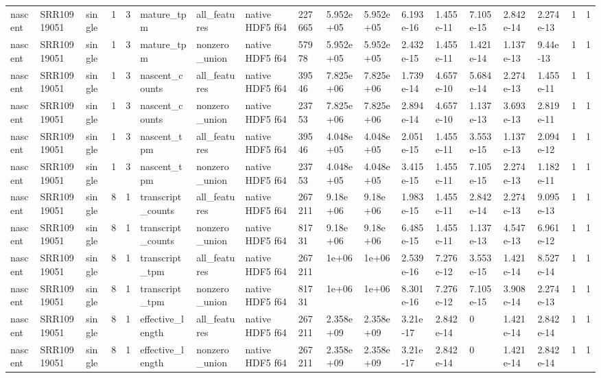 \begin{tabular}{llllllllllllllllll}
nascent & SRR10919051 & single & 1 & 3 & mature\_tpm & all\_features & native HDF5 f64 & 227665 & 5.952e+05 & 5.952e+05 & 6.193e-16 & 1.455e-11 & 7.105e-15 & 2.842e-14 & 2.274e-13 & 1 & 1 \\
nascent & SRR10919051 & single & 1 & 3 & mature\_tpm & nonzero\_union & native HDF5 f64 & 57978 & 5.952e+05 & 5.952e+05 & 2.432e-15 & 1.455e-11 & 1.421e-14 & 1.137e-13 & 9.44e-13 & 1 & 1 \\
nascent & SRR10919051 & single & 1 & 3 & nascent\_counts & all\_features & native HDF5 f64 & 39546 & 7.825e+06 & 7.825e+06 & 1.739e-14 & 4.657e-10 & 5.684e-14 & 2.274e-13 & 1.455e-11 & 1 & 1 \\
nascent & SRR10919051 & single & 1 & 3 & nascent\_counts & nonzero\_union & native HDF5 f64 & 23753 & 7.825e+06 & 7.825e+06 & 2.894e-14 & 4.657e-10 & 1.137e-13 & 3.693e-13 & 2.819e-11 & 1 & 1 \\
nascent & SRR10919051 & single & 1 & 3 & nascent\_tpm & all\_features & native HDF5 f64 & 39546 & 4.048e+05 & 4.048e+05 & 2.051e-15 & 1.455e-11 & 3.553e-15 & 1.137e-13 & 2.094e-12 & 1 & 1 \\
nascent & SRR10919051 & single & 1 & 3 & nascent\_tpm & nonzero\_union & native HDF5 f64 & 23753 & 4.048e+05 & 4.048e+05 & 3.415e-15 & 1.455e-11 & 7.105e-15 & 2.274e-13 & 1.182e-11 & 1 & 1 \\
nascent & SRR10919051 & single & 8 & 1 & transcript\_counts & all\_features & native HDF5 f64 & 267211 & 9.18e+06 & 9.18e+06 & 1.983e-15 & 1.455e-11 & 2.842e-14 & 2.274e-13 & 9.095e-13 & 1 & 1 \\
nascent & SRR10919051 & single & 8 & 1 & transcript\_counts & nonzero\_union & native HDF5 f64 & 81731 & 9.18e+06 & 9.18e+06 & 6.485e-15 & 1.455e-11 & 1.137e-13 & 4.547e-13 & 6.961e-12 & 1 & 1 \\
nascent & SRR10919051 & single & 8 & 1 & transcript\_tpm & all\_features & native HDF5 f64 & 267211 & 1e+06 & 1e+06 & 2.539e-16 & 7.276e-12 & 3.553e-15 & 1.421e-14 & 8.527e-14 & 1 & 1 \\
nascent & SRR10919051 & single & 8 & 1 & transcript\_tpm & nonzero\_union & native HDF5 f64 & 81731 & 1e+06 & 1e+06 & 8.301e-16 & 7.276e-12 & 7.105e-15 & 3.908e-14 & 2.274e-13 & 1 & 1 \\
nascent & SRR10919051 & single & 8 & 1 & effective\_length & all\_features & native HDF5 f64 & 267211 & 2.358e+09 & 2.358e+09 & 3.21e-17 & 2.842e-14 & 0 & 1.421e-14 & 2.842e-14 & 1 & 1 \\
nascent & SRR10919051 & single & 8 & 1 & effective\_length & nonzero\_union & native HDF5 f64 & 267211 & 2.358e+09 & 2.358e+09 & 3.21e-17 & 2.842e-14 & 0 & 1.421e-14 & 2.842e-14 & 1 & 1 \\

\end{tabular}
